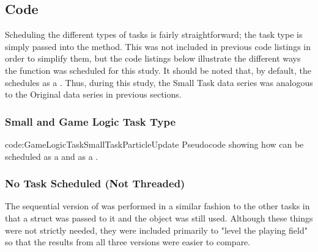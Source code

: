 \subsection{Code}\label{ssec:observe_threads_code}

Scheduling the different types of tasks is fairly straightforward; the task type is simply passed into the  method. This was not included in previous code listings in order to simplify them, but the code listings below illustrate the different ways the  function was scheduled for this study. It should be noted that, by default, the  schedules  as a . Thus, during this study, the Small Task data series was analogous to the Original data series in previous sections.

\vspace{-0.5cm}
\subsubsection{Small and Game Logic Task Type}

\vspace{-1.2cm}
{code:GameLogicTaskSmallTaskParticleUpdate}
{Pseudocode showing how  can be scheduled as a  and as a .}

\vspace{-1.2cm}
\subsubsection{No Task Scheduled (Not Threaded)}

The sequential version of  was performed in a similar fashion to the other tasks in that a struct was passed to it and the  object was still used. Although these things were not strictly needed, they were included primarily to "level the playing field" so that the results from all three versions were easier to compare.


